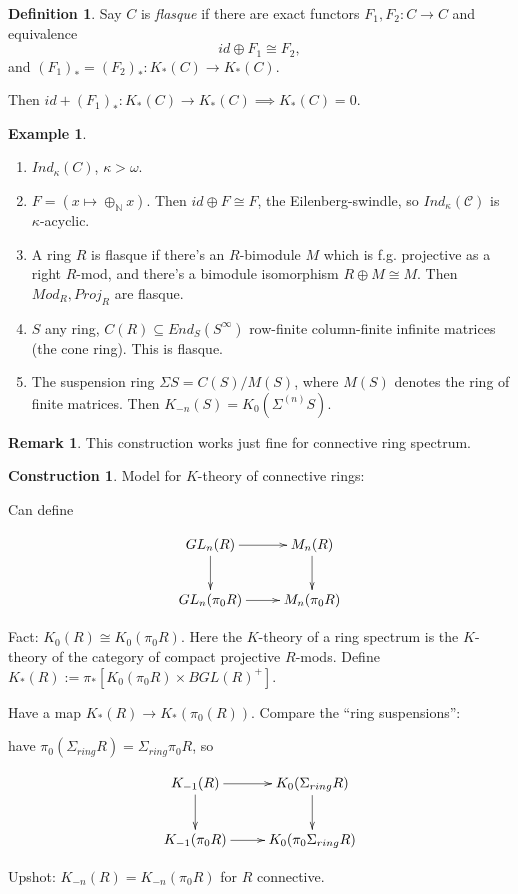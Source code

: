 \documentclass[letterpaper]{article}
\theoremstyle{definition}
\newtheorem{example}[lemma]{Example}
\newtheorem{definition}[lemma]{Definition}
\newtheorem{remark}[lemma]{Remark}
\newtheorem{construction}{Construction}
\newcommand{\mbb}{\mathbb}
\newcommand{\mc}{\mathcal}
\begin{document}
\begin{definition}
Say $C$ is \emph{flasque} if there are exact functors $F_1,F_2 : C
\rightarrow C$ and equivalence
\[
id \oplus F_1 \cong F_2,
\]
and $(F_1)_* = (F_2)_* : K_*(C) \rightarrow K_*(C)$. 


\end{definition}

Then $id +
(F_1)_* : K_*(C) \rightarrow K_*(C) \implies K_*(C) = 0$.

\begin{example}
\begin{enumerate}
\item $Ind_\kappa(C)$, $\kappa > \omega$.
\item $F = (x \mapsto \oplus_{\mbb N} x)$. Then $id \oplus F \cong F$,
  the Eilenberg-swindle, so $Ind_\kappa(\mc C)$ is $\kappa$-acyclic. 
\item A ring $R$ is flasque if there's an $R$-bimodule $M$ which is
  f.g. projective as a right $R$-mod, and there's a bimodule
  isomorphism $R\oplus M \cong M$. Then $Mod_R, Proj_R$ are flasque. 
\item $S$ any ring, $C(R) \subseteq End_S(S^\infty)$ row-finite
  column-finite infinite matrices (the cone ring). This is flasque. 
\item The suspension ring $\Sigma S = C(S)/M(S)$, where $M(S)$ denotes
  the ring of finite matrices. Then $K_{-n}(S) = K_0(\Sigma^{(n)} S)$.
\end{enumerate}
\end{example}

\begin{remark}
This construction works just fine for connective ring spectrum. 
\end{remark}

\begin{construction}
Model for $K$-theory of connective rings: 

Can define

\[
\xymatrix{GL_n(R) \ar[r]\ar[d] & M_n(R) \ar[d] \\ GL_n(\pi_0R) \ar[r]
  & M_n(\pi_0R)}
\]

Fact: $K_0(R) \cong K_0(\pi_0 R)$. Here the $K$-theory of a ring
spectrum is the $K$-theory of the category of compact projective $R$-mods.
Define $K_*(R) := \pi_*[K_0(\pi_0R) \times BGL(R)^+]$.

Have a map $K_*(R) \rightarrow K_*(\pi_0(R))$. Compare the ``ring
suspensions'':

have $\pi_0(\Sigma_{ring} R) = \Sigma_{ring} \pi_0R$, so 

\[
\xymatrix{K_{-1}(R) \ar[r]\ar[d] & K_0(\Sigma_{ring}R)
\ar[d]\\K_{-1}(\pi_0R) \ar[r] &K_0(\pi_0\Sigma_{ring}R)}
\]

Upshot: $K_{-n}(R) = K_{-n}(\pi_0R)$ for $R$ connective. 
\end{construction}
\end{document}
